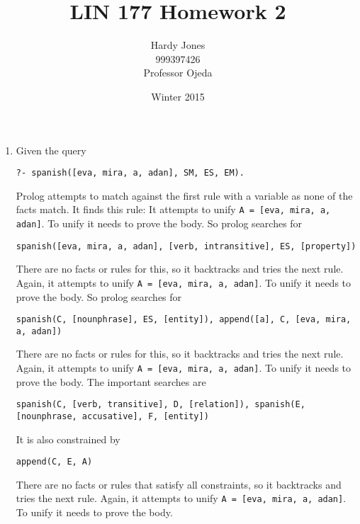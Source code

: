 \documentclass[12pt,letterpaper]{article}
\title{LIN 177 Homework 2\vspace{-2ex}}
\author{Hardy Jones\\
        999397426\\
        Professor Ojeda\vspace{-2ex}}
\date{Winter 2015}
\begin{document}
  \maketitle


  \begin{enumerate}
    \item
      Given the query

      \texttt{?- spanish([eva, mira, a, adan], SM, ES, EM).}

      Prolog attempts to match against the first rule with a variable as none of the facts match.
      It finds this rule:
      It attempts to unify \texttt{A = [eva, mira, a, adan]}.
      To unify it needs to prove the body.
      So prolog searches for

      \texttt{spanish([eva, mira, a, adan], [verb, intransitive], ES, [property])}

      There are no facts or rules for this, so it backtracks and tries the next rule.
      Again, it attempts to unify \texttt{A = [eva, mira, a, adan]}.
      To unify it needs to prove the body.
      So prolog searches for

      \texttt{spanish(C, [nounphrase], ES, [entity]), append([a], C, [eva, mira, a, adan])}

      There are no facts or rules for this, so it backtracks and tries the next rule.
      Again, it attempts to unify \texttt{A = [eva, mira, a, adan]}.
      To unify it needs to prove the body.
      The important searches are

      \texttt{spanish(C, [verb, transitive], D, [relation]), spanish(E, [nounphrase, accusative], F, [entity])}

      It is also constrained by

      \texttt{append(C, E, A)}

      There are no facts or rules that satisfy all constraints, so it backtracks and tries the next rule.
      Again, it attempts to unify \texttt{A = [eva, mira, a, adan]}.
      To unify it needs to prove the body.


\end{enumerate}
\end{document}
